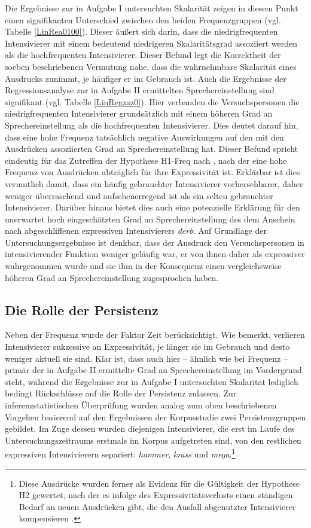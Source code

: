 Die Ergebnisse zur in Aufgabe I untersuchten Skalarität zeigen in diesem Punkt einen signifikanten Unterschied zwischen den beiden Frequenzgruppen (vgl. Tabelle \ref{LinRea0100}). Dieser äußert sich darin, dass die niedrigfrequenten Intensivierer mit einem bedeutend niedrigeren Skalaritätsgrad assoziiert werden als die hochfrequenten Intensivierer. Dieser Befund legt die Korrektheit der soeben beschriebenen Vermutung nahe, dass die wahrnehmbare Skalarität eines Ausdrucks zunimmt, je häufiger er im Gebrauch ist. Auch die Ergebnisse der Regressionsanalyse zur in {Aufgabe II} ermittelten Sprechereinstellung sind signifikant (vgl. {Tabelle \ref{LinRegzaz0}}). Hier verbanden die Versuchspersonen die niedrigfrequenten Intensivierer grundsätzlich mit einem höheren Grad an Sprechereinstellung als die hochfrequenten Intensivierer. Dies deutet darauf hin, dass eine hohe Frequenz tatsächlich negative Auswirkungen auf den mit den Ausdrücken assoziierten Grad an Sprechereinstellung hat. Dieser Befund spricht eindeutig für das Zutreffen der {Hypothese H1-Freq} nach {\citet[2]{Hauschild.1899}}, nach der eine hohe Frequenz von Ausdrücken abträglich für ihre Expressivität ist. Erklärbar ist dies vermutlich damit, dass ein häufig gebrauchter Intensivierer vorhersehbarer, daher weniger überraschend und aufsehenerregend ist als ein selten gebrauchter Intensivierer. Darüber hinaus bietet dies auch eine potenzielle Erklärung für den unerwartet hoch eingeschätzten Grad an Sprechereinstellung des dem Anschein nach abgeschliffenen expressiven Intensivierers \textit{derb}: Auf Grundlage der Untersuchungsergebnisse ist denkbar, dass der Ausdruck den Versuchspersonen in intensivierender Funktion weniger geläufig war, er von ihnen daher als expressiver wahrgenommen wurde und sie ihm in der Konsequenz einen vergleichsweise höheren Grad an Sprechereinstellung zugesprochen haben.


\subsection{Die Rolle der Persistenz}
\largerpage
Neben der Frequenz wurde der Faktor Zeit berücksichtigt. Wie {\citet[59]{Tobler.1868}} bemerkt, verlieren Intensivierer sukzessive an Expressivität, je länger sie im Gebrauch und desto weniger aktuell sie sind. Klar ist, dass auch hier -- ähnlich wie bei Frequenz -- primär der in {Aufgabe II} ermittelte Grad an Sprechereinstellung im Vordergrund steht, während die Ergebnisse zur in Aufgabe I untersuchten Skalarität lediglich bedingt Rückschlüsse auf die Rolle der Persistenz zulassen. Zur inferenzstatistischen Überprüfung wurden analog zum oben beschriebenen Vorgehen basierend auf den Ergebnissen der Korpusstudie zwei Persistenzgruppen gebildet. Im Zuge dessen wurden diejenigen Intensivierer, die erst im Laufe des Untersuchungszeitraums erstmals im Korpus aufgetreten sind, von den restlichen expressiven Intensivierern separiert: \textit{hammer}, \textit{krass} und \textit{mega}.\footnote{Diese Ausdrücke wurden ferner als Evidenz für die Gültigkeit der Hypothese H2 gewertet, nach der es infolge des Expressivitätsverlusts einen ständigen Bedarf an neuen Ausdrücken gibt, die den Ausfall abgenutzter Intensivierer kompensieren {\citep[vgl.][274]{Baumgarten.1908}}.}


